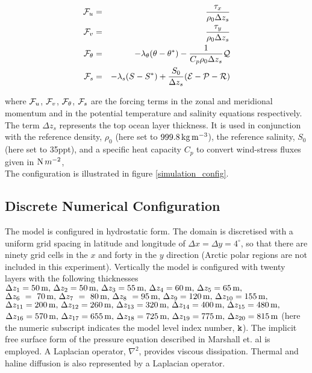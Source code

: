 \begin{eqnarray}
\label{EQ:eg-simple-tracer-global_forcing}
\label{EQ:eg-simple-tracer-global_forcing_fu}
{\cal F}_{u} & = & \frac{\tau_{x}}{\rho_{0} \Delta z_{s}}
\\
\label{EQ:eg-simple-tracer-global_forcing_fv}
{\cal F}_{v} & = & \frac{\tau_{y}}{\rho_{0} \Delta z_{s}}
\\
\label{EQ:eg-simple-tracer-global_forcing_ft}
{\cal F}_{\theta} & = & - \lambda_{\theta} ( \theta - \theta^{\ast} ) 
 - \frac{1}{C_{p} \rho_{0} \Delta z_{s}}{\cal Q}
\\
\label{EQ:eg-simple-tracer-global_forcing_fs}
{\cal F}_{s} & = & - \lambda_{s} ( S - S^{\ast} ) 
 + \frac{S_{0}}{\Delta z_{s}}({\cal E} - {\cal P} - {\cal R})
\end{eqnarray}

\noindent where ${\cal F}_{u}$, ${\cal F}_{v}$, ${\cal F}_{\theta}$,
${\cal F}_{s}$ are the forcing terms in the zonal and meridional
momentum and in the potential temperature and salinity 
equations respectively.
The term $\Delta z_{s}$ represents the top ocean layer thickness.
It is used in conjunction with the reference density, $\rho_{0}$
(here set to $999.8\,{\rm kg\,m^{-3}}$), the
reference salinity, $S_{0}$ (here set to 35ppt),
and a specific heat capacity $C_{p}$ to convert
wind-stress fluxes given in ${\rm N}\,m^{-2}$, 
\\


The configuration is illustrated in figure \ref{simulation_config}.


\subsection{Discrete Numerical Configuration}
\label{www:tutorials}


 The model is configured in hydrostatic form.  The domain is discretised with 
a uniform grid spacing in latitude and longitude of
 $\Delta x=\Delta y=4^{\circ}$, so 
that there are ninety grid cells in the $x$ and forty in the 
$y$ direction (Arctic polar regions are not
included in this experiment). Vertically the 
model is configured with twenty layers with the following thicknesses
$\Delta z_{1} = 50\,{\rm m},\,
 \Delta z_{2} = 50\,{\rm m},\,
 \Delta z_{3} = 55\,{\rm m},\,
 \Delta z_{4} = 60\,{\rm m},\,
 \Delta z_{5} = 65\,{\rm m},\,
$
$
 \Delta z_{6}~=~70\,{\rm m},\,
 \Delta z_{7}~=~80\,{\rm m},\,
 \Delta z_{8}~=95\,{\rm m},\,
 \Delta z_{9}=120\,{\rm m},\,
 \Delta z_{10}=155\,{\rm m},\,
$
$
 \Delta z_{11}=200\,{\rm m},\,
 \Delta z_{12}=260\,{\rm m},\,
 \Delta z_{13}=320\,{\rm m},\,
 \Delta z_{14}=400\,{\rm m},\,
 \Delta z_{15}=480\,{\rm m},\,
$
$
 \Delta z_{16}=570\,{\rm m},\,
 \Delta z_{17}=655\,{\rm m},\,
 \Delta z_{18}=725\,{\rm m},\,
 \Delta z_{19}=775\,{\rm m},\,
 \Delta z_{20}=815\,{\rm m}
$ (here the numeric subscript indicates the model level index number, ${\tt k}$).
The implicit free surface form of the pressure equation described in Marshall et. al 
\cite{marshall:97a} is employed. A Laplacian operator, $\nabla^2$, provides viscous
dissipation. Thermal and haline diffusion is also represented by a Laplacian operator.
\\

